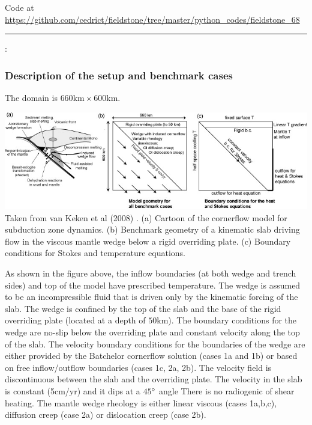 

\begin{center}
Code at \url{https://github.com/cedrict/fieldstone/tree/master/python_codes/fieldstone_68}
\end{center}

\par\noindent\rule{\textwidth}{0.4pt}



\Literature: \cite{vack08}\cite{syva10}\cite{vakn12}


\subsubsection*{Description of the setup and benchmark cases}


The domain is $660\text{km}\times 600\text{km}$. 

\begin{center}
\includegraphics[width=14cm]{python_codes/fieldstone_68/images/fig1}\\
{\captionfont Taken from van Keken et al (2008) \cite{vack08}.
(a) Cartoon of the cornerflow model for subduction zone dynamics. 
(b) Benchmark geometry of a kinematic slab driving flow in the viscous
mantle wedge below a rigid overriding plate. 
(c) Boundary conditions for Stokes and temperature equations.}
\end{center}

As shown in the figure above, 
the inflow boundaries (at both wedge and trench sides) and top of the model 
have prescribed temperature. The wedge is assumed to be an incompressible fluid that
is driven only by the kinematic forcing of the slab. The wedge is
confined by the top of the slab and the base of the rigid overriding
plate (located at a depth of $50\text{km}$). 
The boundary conditions for the wedge are no-slip below the overriding plate and constant velocity
along the top of the slab. The velocity boundary conditions for the
boundaries of the wedge are either provided by the Batchelor cornerflow 
solution (cases 1a and 1b) or based on free inflow/outflow
boundaries (cases 1c, 2a, 2b). The velocity field is discontinuous between the slab
and the overriding plate.
The velocity in the slab is constant (5cm/yr) and it dips at a $45\degree$ angle
There is no radiogenic of shear heating.
The mantle wedge rheology is either linear viscous (cases 1a,b,c),
diffusion creep (case 2a) or dislocation creep (case 2b).





